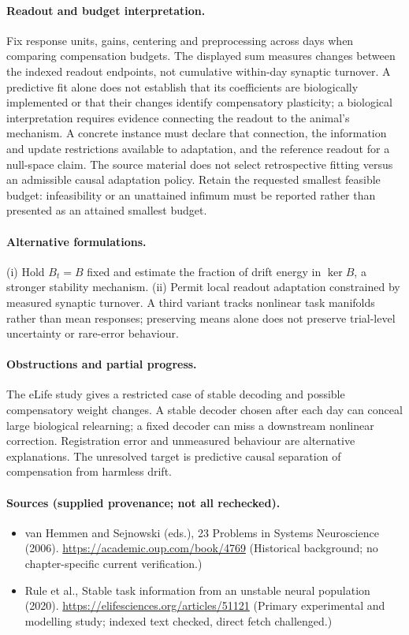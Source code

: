 \documentclass[11pt]{article}
\begin{document}
\paragraph{Readout and budget interpretation.} Fix response units, gains, centering and preprocessing across days when comparing compensation budgets. The displayed sum measures changes between the indexed readout endpoints, not cumulative within-day synaptic turnover. A predictive fit alone does not establish that its coefficients are biologically implemented or that their changes identify compensatory plasticity; a biological interpretation requires evidence connecting the readout to the animal's mechanism. A concrete instance must declare that connection, the information and update restrictions available to adaptation, and the reference readout for a null-space claim. The source material does not select retrospective fitting versus an admissible causal adaptation policy. Retain the requested smallest feasible budget: infeasibility or an unattained infimum must be reported rather than presented as an attained smallest budget.

\paragraph{Alternative formulations.} (i) Hold $B_t=B$ fixed and estimate the fraction of drift energy in $\ker B$, a stronger stability mechanism. (ii) Permit local readout adaptation constrained by measured synaptic turnover. A third variant tracks nonlinear task manifolds rather than mean responses; preserving means alone does not preserve trial-level uncertainty or rare-error behaviour.
\paragraph{Obstructions and partial progress.} The eLife study gives a restricted case of stable decoding and possible compensatory weight changes. A stable decoder chosen after each day can conceal large biological relearning; a fixed decoder can miss a downstream nonlinear correction. Registration error and unmeasured behaviour are alternative explanations. The unresolved target is predictive causal separation of compensation from harmless drift.
\paragraph{Sources (supplied provenance; not all rechecked).} \begin{itemize}
\item van Hemmen and Sejnowski (eds.), 23 Problems in Systems Neuroscience (2006). \url{https://academic.oup.com/book/4769} (Historical background; no chapter-specific current verification.)
\item Rule et al., Stable task information from an unstable neural population (2020). \url{https://elifesciences.org/articles/51121} (Primary experimental and modelling study; indexed text checked, direct fetch challenged.)
\end{itemize}
\end{document}
